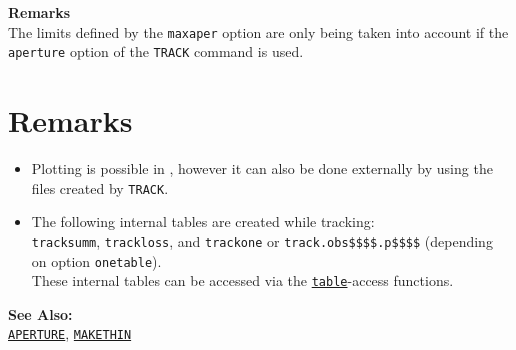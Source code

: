 {\bf Remarks}\\ 
The limits defined by the \texttt{maxaper} option are only being taken
into account if the \texttt{aperture} option of the \texttt{TRACK}
command is used. 
     

\section{Remarks}
\begin{itemize}
   \item Plotting is possible in \madx, however it can also be done
     externally by using the files created by \texttt{TRACK}. 

   \item The following internal tables are created while tracking:\\
     \texttt{tracksumm}, 
     \texttt{trackloss}, and 
     \texttt{trackone} or 
     \texttt{track.obs\$\$\$\$.p\$\$\$\$} 
     (depending on option \texttt{onetable}). \\
     These internal tables can be accessed via the
     \href{../Introduction/expression.html#table}{\texttt{table}}-access
     functions.      
\end{itemize}

{\bf See Also:}\\
\href{../Introduction/aperture.html}{\texttt{APERTURE}}, 
\href{../makethin/makethin.html}{\texttt{MAKETHIN}}



